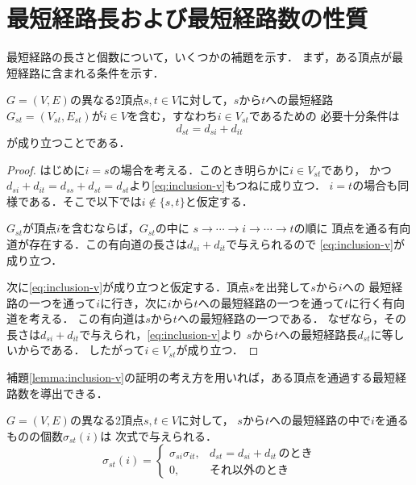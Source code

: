 \section{最短経路長および最短経路数の性質}
\label{sect:shortest-paths}

最短経路の長さと個数について，いくつかの補題を示す．
まず，ある頂点が最短経路に含まれる条件を示す．

\begin{lemma}
  \label{lemma:inclusion-v}
  $G=(V,E)$の異なる2頂点$s,t \in V$に対して，$s$から$t$への最短経路
  $G_{st}=(V_{st},E_{st})$が$i \in V$を含む，すなわち$i \in V_{st}$であるための
  必要十分条件は
  \begin{equation}
    d_{st}=d_{si}+d_{it}
    \label{eq:inclusion-v}
  \end{equation}
  が成り立つことである．
\end{lemma}
\begin{proof}
  はじめに$i=s$の場合を考える．このとき明らかに$i \in V_{st}$であり，
  かつ$d_{si}+d_{it}=d_{ss}+d_{st}=d_{st}$より\eqref{eq:inclusion-v}もつねに成り立つ．
  $i=t$の場合も同様である．そこで以下では$i \not\in \{s,t\}$と仮定する．

  $G_{st}$が頂点$i$を含むならば，$G_{st}$の中に
  $s \rightarrow \cdots \rightarrow i \rightarrow \cdots \rightarrow t$の順に
  頂点を通る有向道が存在する．この有向道の長さは$d_{si}+d_{it}$で与えられるので
  \eqref{eq:inclusion-v}が成り立つ．

  次に\eqref{eq:inclusion-v}が成り立つと仮定する．頂点$s$を出発して$s$から$i$への
  最短経路の一つを通って$i$に行き，次に$i$から$t$への最短経路の一つを通って$t$に行く有向道を考える．
  この有向道は$s$から$t$への最短経路の一つである．
  なぜなら，その長さは$d_{si}+d_{it}$で与えられ，\eqref{eq:inclusion-v}より
  $s$から$t$への最短経路長$d_{st}$に等しいからである．
  したがって$i \in V_{st}$が成り立つ．
\end{proof}

補題\ref{lemma:inclusion-v}の証明の考え方を用いれば，ある頂点を通過する最短経路数を導出できる．

\begin{lemma-without-proof}
  $G=(V,E)$の異なる2頂点$s,t \in V$に対して，
  $s$から$t$への最短経路の中で$i$を通るものの個数$\sigma_{st}(i)$は
  次式で与えられる．
  \begin{equation}
    \sigma_{st}(i)=
    \begin{cases}
      \sigma_{si} \sigma_{it}, & d_{st}=d_{si}+d_{it}\,\text{のとき} \\
      0, & \text{それ以外のとき}
    \end{cases}
  \end{equation}
\end{lemma-without-proof}

